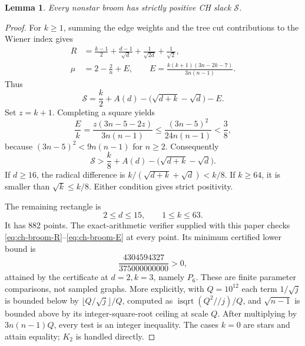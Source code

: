 \documentclass[11pt,a4paper]{article}
\newtheorem{lemma}[theorem]{Lemma}
\theoremstyle{remark}\newtheorem{remark}[theorem]{Remark}
\begin{document}
\begin{lemma}\label{lem:ch-all-brooms}
Every nonstar broom has strictly positive CH slack $\mathcal S$.
\end{lemma}
\begin{proof}
For $k\ge1$, summing the edge weights and the tree cut contributions to
the Wiener index gives
\begin{align}
 R&=\frac{k-1}{2}+\frac{d-1}{\sqrt d}
        +\frac1{\sqrt{2d}}+\frac1{\sqrt2},\label{eq:ch-broom-R}\\
 \mu&=2-\frac2n+E,\qquad
 E=\frac{k(k+1)(3n-2k-7)}{3n(n-1)}.
 \label{eq:ch-broom-E}
\end{align}
Thus
\[
 \mathcal S=\frac k2+A(d)
       -\bigl(\sqrt{d+k}-\sqrt d\bigr)-E.
\]
Set $z=k+1$. Completing a square yields
\[
 \frac Ek=\frac{z(3n-5-2z)}{3n(n-1)}
 \le\frac{(3n-5)^2}{24n(n-1)}<\frac38,
\]
because $(3n-5)^2<9n(n-1)$ for $n\ge2$. Consequently
\begin{equation}\label{eq:ch-broom-simple}
 \mathcal S>\frac k8+A(d)
       -\bigl(\sqrt{d+k}-\sqrt d\bigr).
\end{equation}
If $d\ge16$, the radical difference is
$k/(\sqrt{d+k}+\sqrt d)<k/8$. If $k\ge64$, it is smaller than
$\sqrt k\le k/8$. Either condition gives strict positivity.

The remaining rectangle is
\[
 2\le d\le15,\qquad1\le k\le63.
\]
It has 882 points. The exact-arithmetic verifier supplied with this paper
checks \eqref{eq:ch-broom-R}--\eqref{eq:ch-broom-E} at every point.
Its minimum certified lower bound is
\[
 \frac{4304594327}{375000000000}>0,
\]
attained by the certificate at $d=2,k=3$, namely $P_6$. These are finite
parameter comparisons, not sampled graphs. More explicitly, with
$Q=10^{12}$ each term $1/\sqrt j$ is bounded below by
$\lfloor Q/\sqrt j\rfloor/Q$, computed as
$\operatorname{isqrt}(Q^2\mathbin{//}j)/Q$, and
$\sqrt{n-1}$ is bounded above by its integer-square-root ceiling at scale
$Q$. After multiplying by $3n(n-1)Q$, every test is an integer inequality.
The cases $k=0$ are stars and attain equality; $K_2$ is handled directly.
\end{proof}
\end{document}

